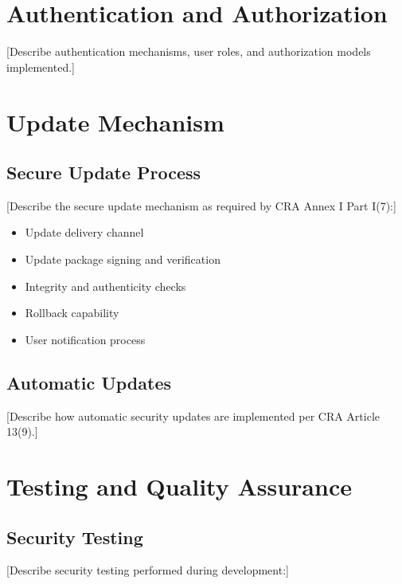 \documentclass[
  11 pt,
  a4paper,
  table]{report}
\providecommand{\tightlist}{%
  \setlength{\itemsep}{0pt}\setlength{\parskip}{0pt}}\usepackage{longtable,booktabs,array}
\begin{document}
\section{Authentication and
Authorization}\label{authentication-and-authorization}

{[}Describe authentication mechanisms, user roles, and authorization
models implemented.{]}

\section{Update Mechanism}\label{update-mechanism}

\subsection{Secure Update Process}\label{secure-update-process}

{[}Describe the secure update mechanism as required by CRA Annex I Part
I(7):{]}

\begin{itemize}
\tightlist
\item
  Update delivery channel
\item
  Update package signing and verification
\item
  Integrity and authenticity checks
\item
  Rollback capability
\item
  User notification process
\end{itemize}

\subsection{Automatic Updates}\label{automatic-updates}

{[}Describe how automatic security updates are implemented per CRA
Article 13(9).{]}

\section{Testing and Quality
Assurance}\label{testing-and-quality-assurance}

\subsection{Security Testing}\label{security-testing}

{[}Describe security testing performed during development:{]}
\end{document}
